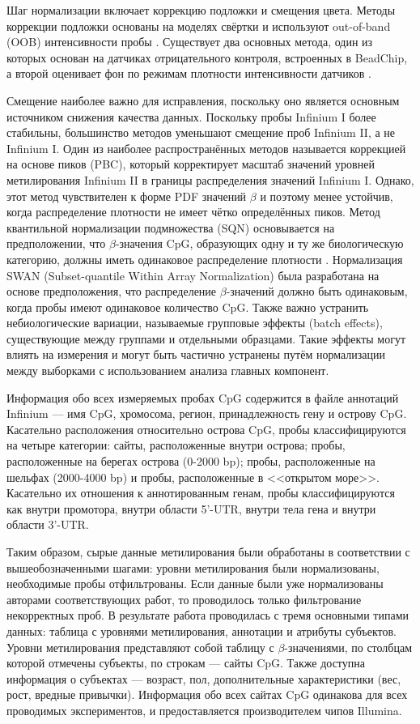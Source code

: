 Шаг нормализации включает коррекцию подложки и смещения цвета. Методы коррекции подложки основаны на моделях свёртки и используют out-of-band (OOB) интенсивности пробы \autocite{Triche2013}. Существует два основных метода, один из которых основан на датчиках отрицательного контроля, встроенных в BeadChip, а второй оценивает фон по режимам плотности интенсивности датчиков \autocite{Dedeurwaerder2011}. 

Смещение наиболее важно для исправления, поскольку оно является основным источником снижения качества данных. Поскольку пробы Infinium I более стабильны, большинство методов уменьшают смещение проб Infinium II, а не Infinium I. Один из наиболее распространённых методов называется коррекцией на основе пиков (PBC), который корректирует масштаб значений уровней метилирования Infinium II в границы распределения значений Infinium I. Однако, этот метод чувствителен к форме PDF значений $\beta$ и поэтому менее устойчив, когда распределение плотности не имеет чётко определённых пиков. Метод квантильной нормализации подмножества (SQN) основывается на предположении, что $\beta$-значения CpG, образующих одну и ту же биологическую категорию, должны иметь одинаковое распределение плотности \autocite{Touleimat2012}. Нормализация SWAN (Subset-quantile Within Array Normalization) \autocite{Maksimovic2012} была разработана на основе предположения, что распределение $\beta$-значений должно быть одинаковым, когда пробы имеют одинаковое количество CpG. Также важно устранить небиологические вариации, называемые групповые эффекты (batch effects), существующие между группами и отдельными образцами. Такие эффекты могут влиять на измерения и могут быть частично устранены путём нормализации между выборками с использованием анализа главных компонент.

Информация обо всех измеряемых пробах CpG содержится в файле аннотаций Infinium --- имя CpG, хромосома, регион, принадлежность гену и острову CpG. Касательно расположения относительно острова CpG, пробы классифицируются на четыре категории: сайты, расположенные внутри острова; пробы, расположенные на берегах острова (0-2000 bp); пробы, расположенные на шельфах (2000-4000 bp) и пробы, расположенные в <<открытом море>>. Касательно их отношения к аннотированным генам, пробы классифицируются как внутри промотора, внутри области 5'-UTR, внутри тела гена и внутри области 3'-UTR. 

Таким образом, сырые данные метилирования были обработаны в соответствии с вышеобозначенными шагами: уровни метилирования были нормализованы, необходимые пробы отфильтрованы. Если данные были уже нормализованы авторами соответствующих работ, то проводилось только фильтрование некорректных проб. В результате работа проводилась с тремя основными типами данных: таблица с уровнями метилирования, аннотации и атрибуты субъектов. Уровни метилирования представляют собой таблицу с $\beta$-значениями, по столбцам которой отмечены субъекты, по строкам --- сайты CpG. Также доступна информация о субъектах --- возраст, пол, дополнительные характеристики (вес, рост, вредные привычки). Информация обо всех сайтах CpG одинакова для всех проводимых экспериментов, и предоставляется производителем чипов Illumina.

